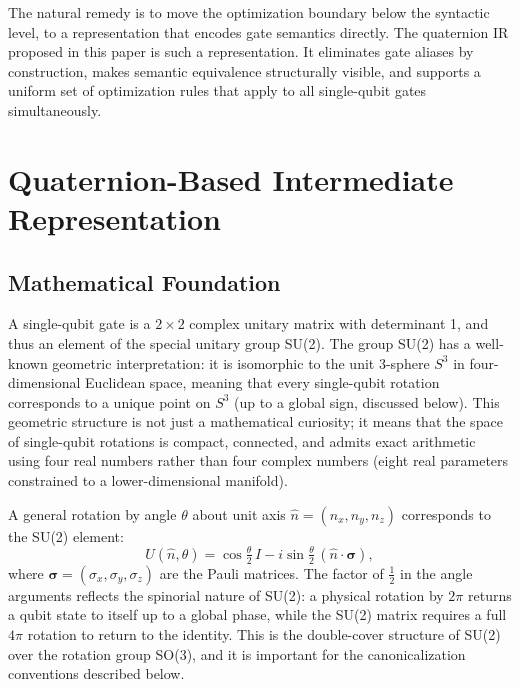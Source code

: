 \documentclass[conference]{IEEEtran}
\begin{document}
The natural remedy is to move the optimization boundary below the syntactic level, to
a representation that encodes gate semantics directly. The quaternion IR proposed in this
paper is such a representation. It eliminates gate aliases by construction, makes
semantic equivalence structurally visible, and supports a uniform set of optimization
rules that apply to all single-qubit gates simultaneously.

\section{Quaternion-Based Intermediate Representation}

\subsection{Mathematical Foundation}

A single-qubit gate is a $2{\times}2$ complex unitary matrix with determinant 1, and thus an
element of the special unitary group SU(2). The group SU(2) has a well-known geometric
interpretation: it is isomorphic to the unit 3-sphere $S^3$ in four-dimensional Euclidean
space, meaning that every single-qubit rotation corresponds to a unique point on $S^3$
(up to a global sign, discussed below). This geometric structure is not just a
mathematical curiosity; it means that the space of single-qubit rotations is compact,
connected, and admits exact arithmetic using four real numbers rather than four complex
numbers (eight real parameters constrained to a lower-dimensional manifold).

A general rotation by angle $\theta$ about unit axis
$\hat{n} = (n_x, n_y, n_z)$ corresponds to the SU(2) element:
\begin{equation}
U(\hat{n}, \theta) = \cos\!\tfrac{\theta}{2}\,I - i\sin\!\tfrac{\theta}{2}\,(\hat{n} \cdot \boldsymbol{\sigma}),
\label{eq:su2}
\end{equation}
where $\boldsymbol{\sigma} = (\sigma_x, \sigma_y, \sigma_z)$ are the Pauli matrices.
The factor of $\tfrac{1}{2}$ in the angle arguments reflects the spinorial nature of
SU(2): a physical rotation by $2\pi$ returns a qubit state to itself up to a global phase,
while the SU(2) matrix requires a full $4\pi$ rotation to return to the identity. This
is the double-cover structure of SU(2) over the rotation group SO(3), and it is important
for the canonicalization conventions described below.
\end{document}
